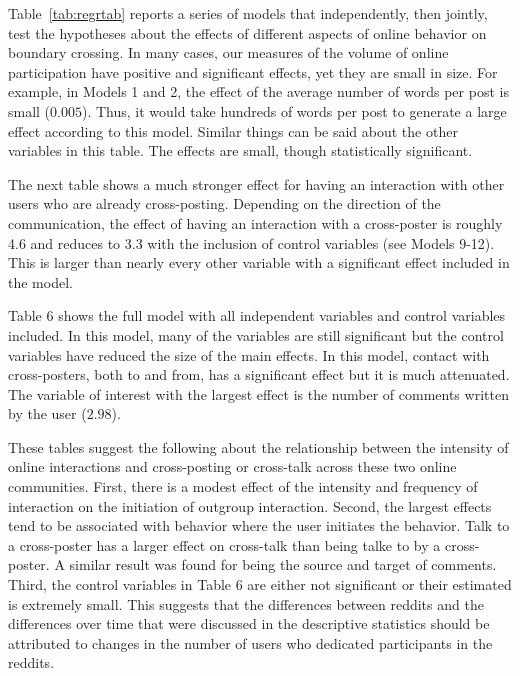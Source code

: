 \documentclass[letterpaper]{article}
\newcommand{\pat}[1]{{\textcolor{red}{Pat: #1}}}
\newcommand{\del}[1]{{\textcolor{gray}{#1}}}
\begin{document}

Table~\ref{tab:regrtab} reports a series of models that independently, then jointly, test the hypotheses about the effects of different aspects of online behavior on boundary crossing. In many cases, our measures of the volume of online participation have positive and significant effects, yet they are small in size. For example, in Models 1 and 2, the effect of the average number of words per post is small ($0.005$). Thus, it would take hundreds of words per post to generate a large effect according to this model. Similar things can be said about the other variables in this table. The effects are small, though statistically significant.

The next table shows a much stronger effect for having an interaction with other users who are already cross-posting. Depending on the direction of the communication, the effect of having an interaction with a cross-poster is roughly 4.6 and reduces to 3.3 with the inclusion of control variables (see Models 9-12). This is larger than nearly every other variable with a significant effect included in the model.

Table 6 shows the full model with all independent variables and control variables included. In this model, many of the variables are still significant but the control variables have reduced the size of the main effects. In this model, contact with cross-posters, both to and from, has a significant effect but it is much attenuated. The variable of interest with the largest effect is the number of comments written by the user ($2.98$). 

These tables suggest the following about the relationship between the intensity of online interactions and cross-posting or cross-talk across these two online communities. First, there is a modest effect of the intensity and frequency of interaction on the initiation of outgroup interaction. Second, the largest effects tend to be associated with behavior where the user initiates the behavior. Talk to a cross-poster has a larger effect on cross-talk than being talke to by a cross-poster. A similar result was found for being the source and target of comments. Third, the control variables in Table 6 are either not significant or their estimated is extremely small. This suggests that the differences between reddits and the differences over time that were discussed in the descriptive statistics should be attributed to changes in the number of users who dedicated participants in the reddits.
\end{document}
